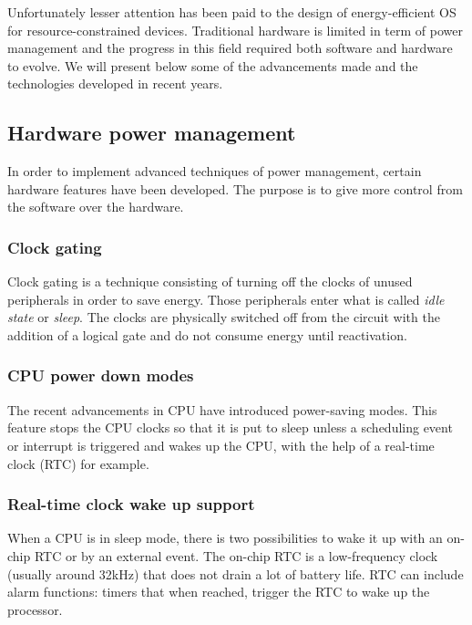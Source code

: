 Unfortunately lesser attention has been paid to the design of energy-efficient OS for resource-constrained devices.
Traditional hardware is limited in term of power management and the progress in this field required both software and hardware to evolve.
We will present below some of the advancements made and the technologies developed in recent years.


\subsection{Hardware power management}
In order to implement advanced techniques of power management, certain hardware features have been developed.
The purpose is to give more control from the software over the hardware.

\subsubsection{Clock gating}
Clock gating is a technique consisting of turning off the clocks of unused peripherals in order to save energy.
Those peripherals enter what is called \textit{idle state} or \textit{sleep}.
The clocks are physically switched off from the circuit with the addition of a logical gate and do not consume energy until reactivation.

\subsubsection{CPU power down modes}
The recent advancements in CPU have introduced power-saving modes.
This feature stops the CPU clocks so that it is put to sleep unless
    a scheduling event or interrupt is triggered and wakes up the CPU, with the help of a real-time clock (RTC) for example.

\subsubsection{Real-time clock wake up support}
When a CPU is in sleep mode, there is two possibilities to wake it up with an on-chip RTC or by an external event.
The on-chip RTC is a low-frequency clock (usually around 32kHz) that does not drain a lot of battery life.
RTC can include alarm functions: timers that when reached, trigger the RTC to wake up the processor.

